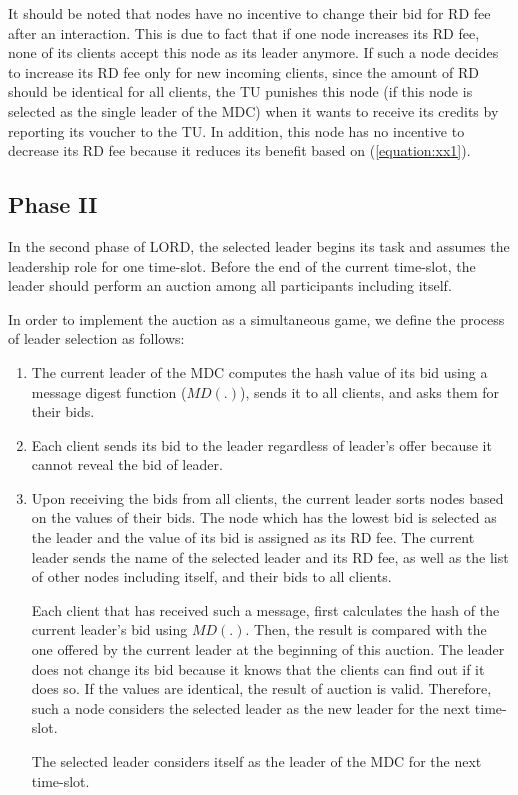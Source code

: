 \documentclass[journal,12pt, onecolumn]{IEEEtran}
\begin{document}
It should be noted that nodes have no incentive to change their bid for RD fee after an interaction. This is due to fact that if one node increases its RD fee, none of its clients accept this node as its leader anymore. If such a node decides to increase its RD fee only for new incoming clients, since the amount of RD should be identical for all clients, the TU punishes this node (if this node is selected as the single leader of the MDC) when it wants to receive its credits by reporting its voucher to the TU. In addition, this node has no incentive to decrease its RD fee because it reduces its benefit based on (\ref{equation:xx1}).





\subsection{Phase II}\label{section:phase2}
In the second phase of LORD, the selected leader begins its task and assumes the leadership role for one time-slot. Before the end of the current time-slot, the leader should perform an auction among all participants including itself.




In order to implement the auction as a simultaneous game, we define the process of leader selection as follows:

\begin{enumerate}
\item The current leader of the MDC computes the hash value of its bid using a message digest function ($MD(.)$), sends it to all clients, and asks them for their bids.
\item Each client sends its bid to the leader regardless of leader's offer because it cannot reveal the bid of leader.
\item Upon receiving the bids from all clients, the current leader sorts nodes based on the values of their bids. The node which has the lowest bid is selected as the leader and the value of its bid is assigned as its RD fee. The current leader sends the name of the selected leader and its RD fee, as well as the list of other nodes including itself, and their bids to all clients. 

Each client that has received such a message, first calculates the hash of the current leader's bid using $MD(.)$. Then, the result is compared with the one offered by the current leader at the beginning of this auction. The leader does not change its bid because it knows that the clients can find out if it does so.
If the values are identical, the result of auction is valid. Therefore, such a node considers the selected leader as the new leader for the next time-slot.

The selected leader considers itself as the leader of the MDC for the next time-slot.
\end{enumerate}
\end{document}
